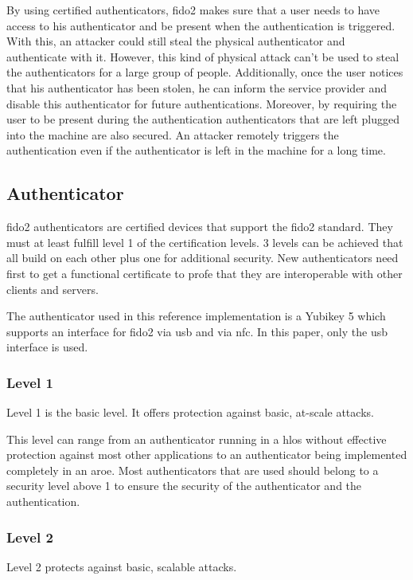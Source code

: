 \documentclass[a4paper, 11pt]{scrartcl}
\begin{document}
By using certified authenticators, \gls{fido2} makes sure that a user needs to have access to his authenticator and be present when the authentication is triggered. With this, an attacker could still steal the physical authenticator and authenticate with it. However, this kind of physical attack can't be used to steal the authenticators for a large group of people. Additionally, once the user notices that his authenticator has been stolen, he can inform the service provider and disable this authenticator for future authentications. Moreover, by requiring the user to be present during the authentication authenticators that are left plugged into the machine are also secured. An attacker remotely triggers the authentication even if the authenticator is left in the machine for a long time. 

\subsection{Authenticator}
\gls{fido2} authenticators are certified devices that support the \gls{fido2} standard. They must at least fulfill level 1 of the certification levels. 3 levels can be achieved that all build on each other plus one for additional security. New authenticators need first to get a functional certificate to profe that they are interoperable with other clients and servers.

The authenticator used in this reference implementation is a Yubikey 5 which supports an interface for \gls{fido2} via \gls{usb} and via \gls{nfc}. In this paper, only the \gls{usb} interface is used.

\subsubsection{Level 1}
Level 1 is the basic level. It offers protection against basic, at-scale attacks. \cite{fido:authenticator:level1}

This level can range from an authenticator running in a \gls{hlos} without effective protection against most other applications to an authenticator being implemented completely in an \gls{aroe}. Most authenticators that are used should belong to a security level above 1 to ensure the security of the authenticator and the authentication. \cite{fido:authenticator:level1}

\subsubsection{Level 2}
Level 2 protects against basic, scalable attacks. \cite{fido:authenticator:level2}
\end{document}
